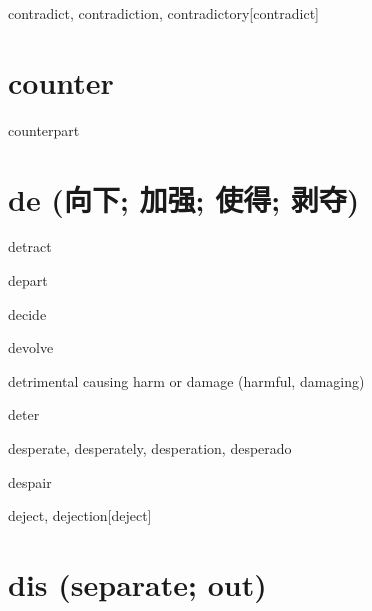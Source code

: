\begin{RefWord}{contradict, contradiction, contradictory}[contradict]
\end{RefWord}

\section{counter}

\begin{RefWord}{counterpart}
\end{RefWord}

\section{de (向下; 加强; 使得; 剥夺)}

\begin{RefWord}{detract}
\end{RefWord}

\begin{RefWord}{depart}
\end{RefWord}

\begin{RefWord}{decide}
\end{RefWord}

\begin{RefWord}{devolve}
\end{RefWord}

\begin{DefWord}{detrimental}
    causing harm or damage (harmful, damaging)
\end{DefWord}

\begin{RefWord}{deter}
\end{RefWord}

\begin{RefWord}{desperate, desperately, desperation, desperado}
\end{RefWord}

\begin{RefWord}{despair}
\end{RefWord}

\begin{RefWord}{deject, dejection}[deject]
\end{RefWord}

\section{dis (separate; out)}


